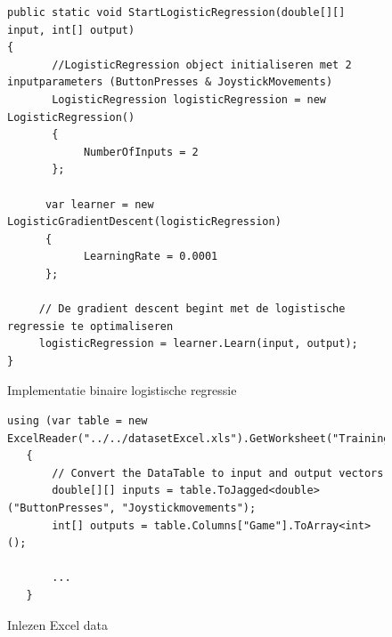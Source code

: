 \begin{figure}[]
	\renewcommand{\figurename}{Code}
\begin{lstlisting}
public static void StartLogisticRegression(double[][] input, int[] output)
{
       //LogisticRegression object initialiseren met 2 inputparameters (ButtonPresses & JoystickMovements)
       LogisticRegression logisticRegression = new LogisticRegression()
       {
       		NumberOfInputs = 2
       };
       
      var learner = new LogisticGradientDescent(logisticRegression)
      {
      		LearningRate = 0.0001
      };
     
     // De gradient descent begint met de logistische regressie te optimaliseren
     logisticRegression = learner.Learn(input, output);
}

\end{lstlisting}
\caption{Implementatie binaire logistische regressie}
\label{code:linaireRegressieTweeKlassen}
\end{figure}
\begin{figure}[]
	\renewcommand{\figurename}{Code}
	\begin{lstlisting}
using (var table = new ExcelReader("../../datasetExcel.xls").GetWorksheet("Training"))
   {
       // Convert the DataTable to input and output vectors
       double[][] inputs = table.ToJagged<double>("ButtonPresses", "Joystickmovements");
       int[] outputs = table.Columns["Game"].ToArray<int>();
       
       ...
   }
	\end{lstlisting}
	\caption{Inlezen Excel data}
	\label{code:dataInlezen}
\end{figure}


